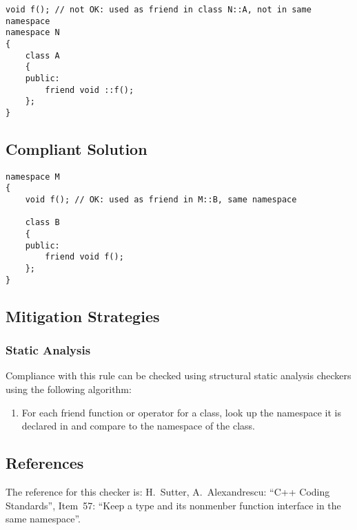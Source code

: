 \begin{verbatim}
void f(); // not OK: used as friend in class N::A, not in same namespace
namespace N
{
    class A
    {
    public:
        friend void ::f();
    };
}
\end{verbatim}

\subsection{Compliant Solution}

\begin{verbatim}
namespace M
{
    void f(); // OK: used as friend in M::B, same namespace

    class B
    {
    public:
        friend void f();
    };
}
\end{verbatim}

\subsection{Mitigation Strategies}
\subsubsection{Static Analysis} 

Compliance with this rule can be checked using structural static analysis checkers using the following algorithm:

\begin{enumerate}
\item For each friend function or operator for a class, look up the namespace
it is declared in and compare to the namespace of the class.
\end{enumerate}

\subsection{References}

The reference for this checker is: H.~Sutter, A.~Alexandrescu:
``C++ Coding Standards'', Item~57: ``Keep a type and its nonmenber function
interface in the same namespace''.
